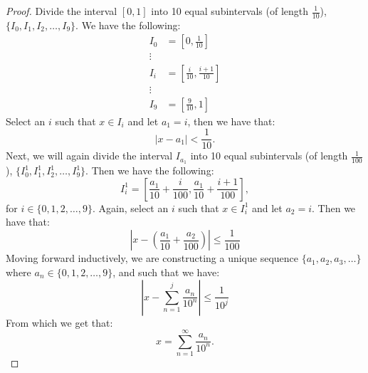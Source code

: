 \documentclass[12pt]{amsart}
\begin{document}
\begin{enumerate}

\begin{proof}
Divide the interval $[0,1]$ into 10 equal subintervals (of length $\frac 1 {10}$), $\{ I_0, I_1, I_2, \ldots, I_9 \}$. We have the following:
\begin{align*}
I_0 &= \left[0, \frac 1 {10}\right] \\
\vdots \\ 
I_i &= \left[\frac i {10}, \frac {i+1} {10}\right] \\
\vdots \\
I_9 &= \left[\frac 9 {10}, 1\right]
\end{align*}
Select an $i$ such that $x \in I_i$ and let $a_1 = i$, then we have that:
%
\[ | x - a_1| < \frac 1 {10}. \]
%
Next, we will again divide the interval $I_{a_1}$ into 10 equal subintervals (of length $\frac 1 {100}$), $\{ I_0^1, I_1^1, I_2^1, \ldots, I_9^1 \}$. Then we have the following:
%
\[ I_i^1 = \left[\frac {a_1}{10} + \frac{i}{100}, \frac{a_1}{10} + \frac {i+1} {100}\right], \]
%
for $i\in \{ 0, 1, 2,\ldots, 9\}$. Again, select an $i$ such that $x \in I_i^1$ and let $a_2 = i$. Then we have that:
%
\[ \left| x - \left(\frac{a_1}{10} + \frac{a_2}{100}\right)\right| \le \frac 1 {100} \]
%
Moving forward inductively, we are constructing a unique sequence $\{ a_1, a_2, a_3, \ldots \}$ where $a_n\in \{ 0, 1, 2,\ldots, 9\}$, and such that we have:
%
\[ \left| x - \sum_{n=1}^j \frac{a_n}{10^n} \right| \le \frac 1 {10^j} \]
%
From which we get that:
%
\[ x = \sum_{n=1}^\infty \frac{a_n}{10^n}. \]
%
\end{proof}

\end{enumerate}
\end{document}
